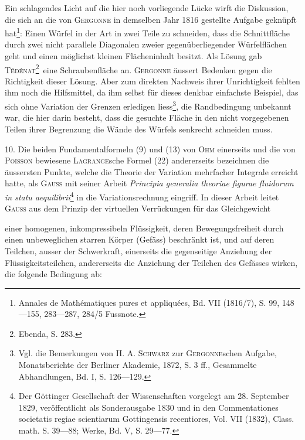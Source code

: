 Ein schlagendes Licht auf die hier noch vorliegende Lücke wirft die
Diskussion, die sich an die von \textsc{Gergonne} in demselben Jahr 1816 gestellte
Aufgabe geknüpft hat\footnote{Annales de Mathématiques pures et appliquées, Bd. VII (1816/7), S. 99, 148—155, 283—287, 284/5 Fussnote.}: Einen Würfel in der Art in zwei Teile zu schneiden,
dass die Schnittfläche durch zwei nicht parallele Diagonalen zweier gegenüberliegender
Würfelflächen geht und einen möglichst kleinen Flächeninhalt besitzt.
Als Lösung gab \textsc{Tédénat}\begingroup\renewcommand{\thefootnote}{31a)}\footnote{Ebenda, S. 283.}\endgroup\setcounter{footnote}{31}\ eine Schraubenfläche an. \textsc{Gergonne} äussert
Bedenken gegen die Richtigkeit dieser Lösung. Aber zum direkten Nachweis
ihrer Unrichtigkeit fehlten ihm noch die Hilfsmittel, da ihm selbst für dieses
denkbar einfachste Beispiel, das sich ohne Variation der Grenzen erledigen
liess\footnote{Vgl. die Bemerkungen von \textsc{H. A. Schwarz} zur \textsc{Gergonne}schen Aufgabe, Monatsberichte der Berliner Akademie, 1872, S. 3 ff., Gesammelte Abhandlungen, Bd. I, S. 126—129.}, die Randbedingung unbekannt war, die hier darin besteht, dass die
gesuchte Fläche in den nicht vorgegebenen Teilen ihrer Begrenzung die Wände
des Würfels senkrecht schneiden muss.

\begin{center}
\par
{}
\end{center}

10. Die beiden Fundamentalformeln (9) und (13) von \textsc{Ohm} einerseits und
die von \textsc{Poisson} bewiesene \textsc{Lagrange}sche Formel (22) andererseits bezeichnen
die äussersten Punkte, welche die Theorie der Variation mehrfacher Integrale
erreicht hatte, als \textsc{Gauss} mit seiner Arbeit \textit{Principia generalia theoriae figurae fluidorum
in statu aequilibrii}\footnote{Der Göttinger Gesellschaft der Wissenschaften vorgelegt am 28. September 1829, veröffentlicht als Sonderausgabe 1830 und in den Commentationes societatis regiae scientiarum Gottingensis recentiores, Vol. VII (1832), Class. math. S. 39—88; Werke, Bd. V, S. 29—77.} in die Variationsrechnung eingriff. In dieser Arbeit
leitet \textsc{Gauss} aus dem Prinzip der virtuellen Verrückungen für das Gleichgewicht
\par\clearpage{}
\noindent einer homogenen, inkompressibeln Flüssigkeit, deren Bewegungsfreiheit
durch einen unbeweglichen starren Körper (Gefäss) beschränkt ist, und auf
deren Teilchen, ausser der Schwerkraft, einerseits die gegenseitige Anziehung
der Flüssigkeitsteilchen, andererseits die Anziehung der Teilchen des Gefässes
wirken, die folgende Bedingung ab:

